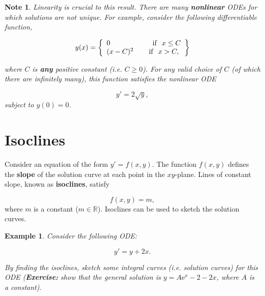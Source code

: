 \documentclass[a4paper]{report}
\newtheorem{example}{Example}[chapter]
\newtheorem*{note}{Note}
\begin{document}
\begin{note}
Linearity is crucial to this result. There are many {\bf nonlinear} ODEs for which solutions are not unique. For example, consider the following differentiable function,

\begin{displaymath}
y(x)=\left\{\begin{array}{l} 0  \hspace{0.83in} \mbox{if}
      \hspace{0.1in} x\le C \\ (x-C)^2 \hspace{0.3in} \mbox{if} \hspace{0.1in} x > C,
    \end{array} \right\}
\end{displaymath}  

\noindent where $C$ is {\bf any} positive constant (i.e. $C\ge 0$). For any valid choice of $C$ (of which there are infinitely many), this function satisfies the nonlinear ODE

\begin{displaymath}
y'=2\sqrt{y},
\end{displaymath}
\noindent subject to $y(0)=0$.


\end{note}

\section{Isoclines}
\label{sec:first:iso}

Consider an equation of the form $y'=f(x,y)$. The function $f(x,y)$ defines the {\bf slope} of the solution curve at each point in the $xy$-plane. Lines of constant slope, known as {\bf isoclines}, satisfy 

\begin{equation}
\label{eqn:first:isocline}
f(x,y)=m,
\end{equation}
\noindent where $m$ is a constant ($m\in\mathbb{R}$). Isoclines can be used to sketch the solution curves. 

\begin{example}
\label{ex:first:iso}
Consider the following ODE:

\begin{displaymath}
y' = y+2x.
\end{displaymath}

\noindent By finding the isoclines, sketch some integral curves (i.e. solution curves) for this ODE ({\bf Exercise:} show that the general solution is $\displaystyle{y=A\mathrm{e}^x-2-2x}$, where $A$ is a constant).
\end{example}
\end{document}
